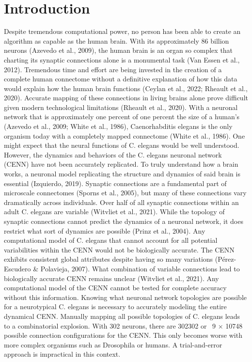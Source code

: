 \section{Introduction}
Despite tremendous computational power, no person has been able to create an algorithm as capable as the human brain. With its approximately 86 billion neurons (Azevedo et al., 2009), the human brain is an organ so complex that charting its synaptic connections alone is a monumental task (Van Essen et al., 2012). Tremendous time and effort are being invested in the creation of a complete human connectome without a definitive explanation of how this data would explain how the human brain functions (Ceylan et al., 2022; Rheault et al., 2020). Accurate mapping of these connections in living brains alone prove difficult given modern technological limitations (Rheault et al., 2020). With a neuronal network that is approximately one percent of one percent the size of a human’s (Azevedo et al., 2009; White et al., 1986), Caenorhabditis elegans is the only organism today with a completely mapped connectome (White et al., 1986). One might expect that the neural functions of C. elegans would be well understood. However, the dynamics and behaviors of the C. elegans neuronal network (CENN) have not been accurately replicated. To truly understand how a brain works, a neuronal model replicating the structure and dynamics of said brain is essential (Izquierdo, 2019). 
Synaptic connections are a fundamental part of microscale connectomes (Sporns et al., 2005), but many of these connections vary dramatically across individuals. Over half of all synaptic connections within an adult C. elegans are variable (Witvliet et al., 2021). While the topology of synaptic connections cannot predict the dynamics of a neuronal network, it does restrict what sort of dynamics are possible (Prinz et al., 2004). Any computational model of C. elegans that cannot account for all potential variabilities within the CENN would not be biologically accurate. The CENN exhibits consistent global attributes despite having so many variations (Pérez-Escudero \& Polavieja, 2007). What combination of variable connections lead to biologically accurate CENN remains unclear (Witvliet et al., 2021). Any computational model of the CENN cannot be tested for complete accuracy without this information. 
Knowing what neuronal network topologies are possible for a neurotypical C. elegans is necessary to accurately modeling the entire dynamical CENN. Manually mapping all possible topologies of C. elegans leads to a combinatorial explosion. With 302 neurons, there are 302302 or ~9 × 10748 possible connection configurations for the CENN. This only becomes worse with more complex organisms such as Drosophila or humans. A trial-and-error approach is impractical in this context.
